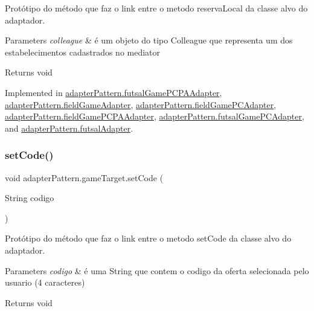 Protótipo do método que faz o link entre o metodo reserva\+Local da classe alvo do adaptador. 


\begin{DoxyParams}{Parameters}
{\em colleague} & é um objeto do tipo Colleague que representa um dos estabelecimentos cadastrados no mediator \\
\hline
\end{DoxyParams}
\begin{DoxyReturn}{Returns}
void 
\end{DoxyReturn}


Implemented in \mbox{\hyperlink{classadapter_pattern_1_1futsal_game_p_c_p_a_adapter_a28c5a42f15d0172202096458d4889b11}{adapter\+Pattern.\+futsal\+Game\+P\+C\+P\+A\+Adapter}}, \mbox{\hyperlink{classadapter_pattern_1_1field_game_adapter_a6a08d37797c204b6dfff86d9f827c0c5}{adapter\+Pattern.\+field\+Game\+Adapter}}, \mbox{\hyperlink{classadapter_pattern_1_1field_game_p_c_adapter_ae63b5475c08a72e02d8c9c4302572a05}{adapter\+Pattern.\+field\+Game\+P\+C\+Adapter}}, \mbox{\hyperlink{classadapter_pattern_1_1field_game_p_c_p_a_adapter_a48109e67cbc5c62c1148f26e4fca8687}{adapter\+Pattern.\+field\+Game\+P\+C\+P\+A\+Adapter}}, \mbox{\hyperlink{classadapter_pattern_1_1futsal_game_p_c_adapter_ab7e29595aed0c0f7e9c706acf4cb2335}{adapter\+Pattern.\+futsal\+Game\+P\+C\+Adapter}}, and \mbox{\hyperlink{classadapter_pattern_1_1futsal_adapter_a00b5a3952a49e80ee156d62a7b59e372}{adapter\+Pattern.\+futsal\+Adapter}}.

\mbox{\label{interfaceadapter_pattern_1_1game_target_a9ea61c0d011aa457f9a8c887d086044a}} 
\subsubsection{\texorpdfstring{setCode()}{setCode()}}
{\footnotesize\ttfamily void adapter\+Pattern.\+game\+Target.\+set\+Code (\begin{DoxyParamCaption}\item[{String}]{codigo }\end{DoxyParamCaption})}



Protótipo do método que faz o link entre o metodo set\+Code da classe alvo do adaptador. 


\begin{DoxyParams}{Parameters}
{\em codigo} & é uma String que contem o codigo da oferta selecionada pelo usuario (4 caracteres) \\
\hline
\end{DoxyParams}
\begin{DoxyReturn}{Returns}
void 
\end{DoxyReturn}


